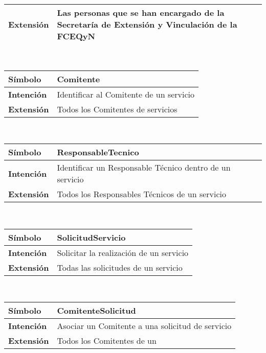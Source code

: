\begin{center}
{\begin{tabular}{ | p{2.5cm} | p{13cm} | }
	\textbf{Extensi\'on} &
	Las personas que se han encargado de la
	Secretar\'ia de Extensi\'on y Vinculaci\'on
	de la FCEQyN \\
	\hline
\end{tabular}} \\[1cm]
\hypertarget{comitente}{%
\begin{tabular}{ | p{2.5cm} | p{13cm} | }
	\hline
	\cellcolor{lightgray}
	\textbf{S\'imbolo} &
	Comitente  \\
	\hline
	\cellcolor{lightgray}
	\textbf{Intenci\'on} &
	Identificar al Comitente de un servicio \\
	\hline
	\cellcolor{lightgray}
	\textbf{Extensi\'on} &
	Todos los Comitentes de servicios \\
	\hline
\end{tabular}} \\[1cm]
\hypertarget{responsabletecnico}{%
\begin{tabular}{ | p{2.5cm} | p{13cm} | }
	\hline
	\cellcolor{lightgray}
	\textbf{S\'imbolo} &
	ResponsableTecnico  \\
	\hline
	\cellcolor{lightgray}
	\textbf{Intenci\'on} &
	Identificar un Responsable T\'ecnico
	dentro de un servicio \\
	\hline
	\cellcolor{lightgray}
	\textbf{Extensi\'on} &
	Todos los Responsables T\'ecnicos de
	un servicio \\
	\hline
\end{tabular}} \\[1cm]
\hypertarget{solicitudservicio}{%
\begin{tabular}{ | p{2.5cm} | p{13cm} | }
	\hline
	\cellcolor{lightgray}
	\textbf{S\'imbolo} &
	SolicitudServicio  \\
	\hline
	\cellcolor{lightgray}
	\textbf{Intenci\'on} &
	Solicitar la realizaci\'on de un
	servicio \\
	\hline
	\cellcolor{lightgray}
	\textbf{Extensi\'on} &
	Todas las solicitudes de un
	servicio \\
	\hline
\end{tabular}} \\[1cm]
\hypertarget{comitentesolicitud}{%
\begin{tabular}{ | p{2.5cm} | p{13cm} | }
	\hline
	\cellcolor{lightgray}
	\textbf{S\'imbolo} &
	ComitenteSolicitud  \\
	\hline
	\cellcolor{lightgray}
	\textbf{Intenci\'on} &
	Asociar un Comitente a una
	solicitud de servicio \\
	\hline
	\cellcolor{lightgray}
	\textbf{Extensi\'on} &
	Todos los Comitentes de un

\end{tabular}}
\end{center}
